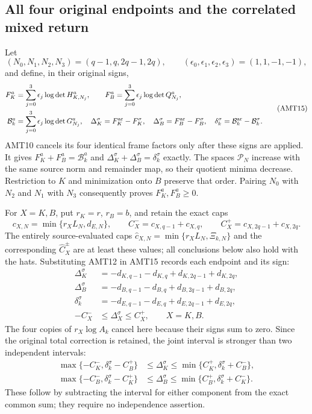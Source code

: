 \documentclass[11pt,a4paper]{article}
\begin{document}
\subsection{All four original endpoints and the correlated mixed return}
Let
\[
 (N_0,N_1,N_2,N_3)=(q-1,q,2q-1,2q),\qquad
 (\epsilon_0,\epsilon_1,\epsilon_2,\epsilon_3)=(1,1,-1,-1),
\]
and define, in their original signs,
\[
\begin{split}
 F_K^a&=\sum_{j=0}^3\epsilon_j\log\det H_{K,N_j}^a,\qquad
 F_B^a=\sum_{j=0}^3\epsilon_j\log\det Q_{N_j}^a,\\
 \mathcal B_k^a&=\sum_{j=0}^3\epsilon_j\log\det G_{N_j}^a,
 \quad\Delta_K^\sigma=F_K^{\rm ar}-F_K^\sigma,
 \quad\Delta_B^\sigma=F_B^{\rm ar}-F_B^\sigma,
 \quad\delta_k^\sigma=\mathcal B_k^{\rm ar}-\mathcal B_k^\sigma.
\end{split}\tag{AMT15}
\]
AMT10 cancels its four identical frame factors only after these
signs are applied. It gives
$F_K^a+F_B^a=\mathcal B_k^a$ and
$\Delta_K^\sigma+\Delta_B^\sigma=\delta_k^\sigma$ exactly.
The spaces $\mathcal P_N$ increase with the same source norm and
remainder map, so their quotient minima decrease. Restriction to
$K$ and minimization onto $B$ preserve that order. Pairing $N_0$
with $N_2$ and $N_1$ with $N_3$ consequently proves
$F_K^a,F_B^a\ge0$.

For $X=K,B$, put $r_K=r$, $r_B=b$, and retain the exact caps
\[
 c_{X,N}=\min\{r_XL_N,d_{E,N}\},\qquad
 C_X^-=c_{X,q-1}+c_{X,q},\qquad
 C_X^+=c_{X,2q-1}+c_{X,2q}.
 \tag{AMT16}
\]
The entirely source-evaluated caps
$\widehat c_{X,N}=\min\{r_XL_N,\Xi_{k,N}\}$ and the corresponding
$\widehat C_X^\pm$ are at least these values; all conclusions below
also hold with the hats. Substituting AMT12 in AMT15 records each
endpoint and its sign:
\[
\boxed{\begin{split}
 \Delta_K^\sigma&=-d_{K,q-1}-d_{K,q}+d_{K,2q-1}+d_{K,2q},\\
 \Delta_B^\sigma&=-d_{B,q-1}-d_{B,q}+d_{B,2q-1}+d_{B,2q},\\
 \delta_k^\sigma&=-d_{E,q-1}-d_{E,q}+d_{E,2q-1}+d_{E,2q},\\
 -C_X^-&\le\Delta_X^\sigma\le C_X^+,\qquad X=K,B.
\end{split}}\tag{AMT17}
\]
The four copies of $r_X\log A_k$ cancel here because their signs
sum to zero. Since the original total correction is retained, the
joint interval is stronger than two independent intervals:
\[
\boxed{\begin{split}
 \max\{-C_K^-,\delta_k^\sigma-C_B^+\}
   &\le\Delta_K^\sigma\le
          \min\{C_K^+,\delta_k^\sigma+C_B^-\},\\
 \max\{-C_B^-,\delta_k^\sigma-C_K^+\}
   &\le\Delta_B^\sigma\le
          \min\{C_B^+,\delta_k^\sigma+C_K^-\}.
\end{split}}\tag{AMT18}
\]
These follow by subtracting the interval for either component from
the exact common sum; they require no independence assertion.
\end{document}
